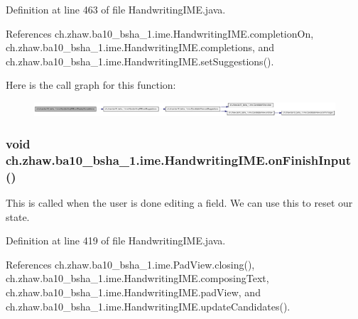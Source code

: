 Definition at line 463 of file HandwritingIME.java.

References ch.zhaw.ba10\_\-bsha\_\-1.ime.HandwritingIME.completionOn, ch.zhaw.ba10\_\-bsha\_\-1.ime.HandwritingIME.completions, and ch.zhaw.ba10\_\-bsha\_\-1.ime.HandwritingIME.setSuggestions().

Here is the call graph for this function:\nopagebreak
\begin{figure}[H]
\begin{center}
\leavevmode
\includegraphics[width=420pt]{classch_1_1zhaw_1_1ba10__bsha__1_1_1ime_1_1HandwritingIME_a5e02e524ed9e962644d630cc0facda16_cgraph}
\end{center}
\end{figure}
\hypertarget{classch_1_1zhaw_1_1ba10__bsha__1_1_1ime_1_1HandwritingIME_a1b167f4b94b905a354b0713f15ef4a92}{
\subsubsection[{onFinishInput}]{\setlength{\rightskip}{0pt plus 5cm}void ch.zhaw.ba10\_\-bsha\_\-1.ime.HandwritingIME.onFinishInput ()}}
\label{classch_1_1zhaw_1_1ba10__bsha__1_1_1ime_1_1HandwritingIME_a1b167f4b94b905a354b0713f15ef4a92}
This is called when the user is done editing a field. We can use this to reset our state. 

Definition at line 419 of file HandwritingIME.java.

References ch.zhaw.ba10\_\-bsha\_\-1.ime.PadView.closing(), ch.zhaw.ba10\_\-bsha\_\-1.ime.HandwritingIME.composingText, ch.zhaw.ba10\_\-bsha\_\-1.ime.HandwritingIME.padView, and ch.zhaw.ba10\_\-bsha\_\-1.ime.HandwritingIME.updateCandidates().

